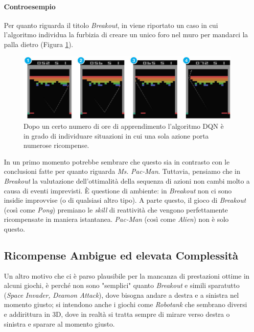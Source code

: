 \documentclass[twoside,twocolumn,10pt]{extarticle}
\theoremstyle{definition}
\begin{document}
		\paragraph*{Controesempio} Per quanto riguarda il titolo \textit{Breakout}, in \cite{bib:dqn} viene riportato un caso in cui l'algoritmo individua la furbizia di creare un unico foro nel muro per mandarci la palla dietro (Figura \ref{fig:breakout}).		
		\begin{figure}[h]
			\centering
			\includegraphics[scale=.65]{images/breakout.png}
			\caption{Dopo un certo numero di ore di apprendimento l'algoritmo DQN è in grado di individuare situazioni in cui una sola azione porta numerose ricompense.}
			\label{fig:breakout}
		\end{figure} 
		In un primo momento potrebbe sembrare che questo sia in contrasto con le conclusioni fatte per quanto riguarda \textit{Ms. Pac-Man}. Tuttavia, pensiamo che in \textit{Breakout} la valutazione dell'ottimalità della sequenza di azioni non cambi molto a causa di eventi imprevisti. È questione di ambiente: in \textit{Breakout} non ci sono insidie improvvise (o di qualsiasi altro tipo). A parte questo, il gioco di \textit{Breakout} (così come \textit{Pong}) premiano le \textit{skill} di reattività che vengono perfettamente ricompensate in maniera istantanea. \textit{Pac-Man} (così come \textit{Alien}) non è solo questo.
	
	\subsection{Ricompense Ambigue ed elevata Complessità}\label{subsec:suicide}
		Un altro motivo che ci è parso plausibile per la mancanza di prestazioni ottime in alcuni giochi, è perché non sono "semplici" quanto \textit{Breakout} e simili sparatutto (\textit{Space Invader, Deamon Attack}), dove bisogna andare a destra e a sinistra nel momento giusto; si intendono anche i giochi come \textit{Robotank} che sembrano diversi e addirittura in 3D, dove in realtà si tratta sempre di mirare verso destra o sinistra e sparare al momento giusto.
		
\end{document}
